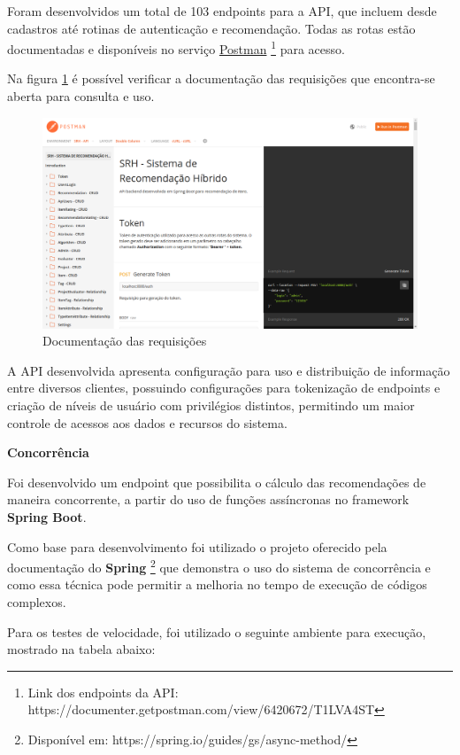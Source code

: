 Foram desenvolvidos um total de 103 endpoints para a API, que incluem desde cadastros até rotinas de autenticação e recomendação. Todas as rotas estão documentadas e disponíveis no serviço \href{https://documenter.getpostman.com/view/6420672/T1LVA4ST}{Postman} \footnote{Link dos endpoints da API: https://documenter.getpostman.com/view/6420672/T1LVA4ST} para acesso.

Na figura \ref{fig:requisicaoPostman} é possível verificar a documentação das requisições que encontra-se aberta para consulta e uso.

\begin{figure}[H]
	\centering
	\includegraphics[width=1\linewidth]{imagens/requisicoesPostman.png}
	\caption[Documentação das requisições]{Documentação das requisições}
    \label{fig:requisicaoPostman}
\end{figure}

A API desenvolvida apresenta configuração para uso e distribuição de informação entre diversos clientes, possuindo configurações para tokenização de endpoints e criação de níveis de usuário com privilégios distintos, permitindo um maior controle de acessos aos dados e recursos do sistema.

\textbf{Concorrência}

Foi desenvolvido um endpoint que possibilita o cálculo das recomendações de maneira concorrente, a partir do uso de funções assíncronas no framework \textbf{Spring Boot}.

Como base para desenvolvimento foi utilizado o projeto oferecido pela documentação do \textbf{Spring} \footnote{Disponível em: https://spring.io/guides/gs/async-method/} que demonstra o uso do sistema de concorrência e como essa técnica pode permitir a melhoria no tempo de execução de códigos complexos.

Para os testes de velocidade, foi utilizado o seguinte ambiente para execução, mostrado na tabela abaixo:

